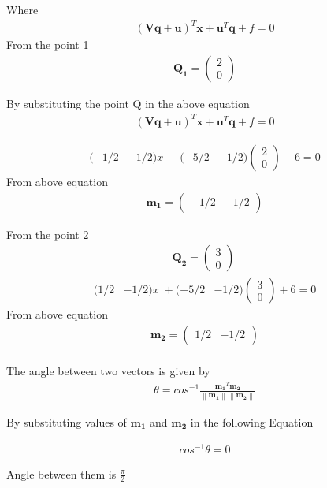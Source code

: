 \documentclass[journal,10pt,twocolumn]{article}
\providecommand{\norm}[1]{\left\lVert#1\right\rVert}
\let\vec\mathbf
\newcommand{\myvec}[1]{\ensuremath{\begin{pmatrix}#1\end{pmatrix}}}
\begin{document}
Where  
\begin{eqnarray}
(\vec{V}\vec{q}+\vec{u})^T\vec{x}+\vec{u}^T\vec{q}+f=0
\end{eqnarray}
From the point 1
\begin{eqnarray}
\vec{Q_1}=\myvec{2\\0}
\end{eqnarray}

By substituting the point Q in the above equation
\begin{eqnarray}
	(\vec{V}\vec{q}+\vec{u})^T\vec{x}+\vec{u}^T\vec{q}+f=0
\end{eqnarray}




\begin{eqnarray}
(-1/2&-1/2)x\;+(-5/2&-1/2)\myvec{2\\0}+6=0
\end{eqnarray}
From above equation
\begin{eqnarray}
\vec{m_1}=\myvec{-1/2 & -1/2}
\end{eqnarray} 

From the point 2
\begin{align}
\vec{Q_2}=\myvec{3\\0}\
\end{align}
\begin{eqnarray}
(1/2 & -1/2)x\;+(-5/2&-1/2)\myvec{3\\0}+6=0
\end{eqnarray}
From above equation
\begin{eqnarray}
\vec{m_2}=\myvec{1/2&-1/2}
\end{eqnarray} 
\\
The angle between two vectors is given by 
\begin{eqnarray}
	\theta=cos^{-1}\frac{\vec{m_1}^T\vec{m_2}}{\norm{\vec{m_1}}\norm{\vec{m_2}}}
\end{eqnarray}

By substituting values of $\vec{m_1}$ and $\vec{m_2}$ in the following Equation 

\begin{eqnarray}
	cos^{-1}\theta=0
\end{eqnarray}


Angle between them is $\frac{\pi}{2}$




 
\end{document}
